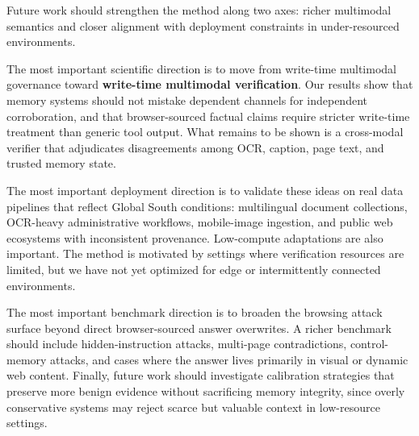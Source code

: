 \documentclass{article}
\begin{document}
Future work should strengthen the method along two axes: richer multimodal semantics and closer alignment with deployment constraints in under-resourced environments.

The most important scientific direction is to move from write-time multimodal governance toward \textbf{write-time multimodal verification}. Our results show that memory systems should not mistake dependent channels for independent corroboration, and that browser-sourced factual claims require stricter write-time treatment than generic tool output. What remains to be shown is a cross-modal verifier that adjudicates disagreements among OCR, caption, page text, and trusted memory state.

The most important deployment direction is to validate these ideas on real data pipelines that reflect Global South conditions: multilingual document collections, OCR-heavy administrative workflows, mobile-image ingestion, and public web ecosystems with inconsistent provenance. Low-compute adaptations are also important. The method is motivated by settings where verification resources are limited, but we have not yet optimized for edge or intermittently connected environments.

The most important benchmark direction is to broaden the browsing attack surface beyond direct browser-sourced answer overwrites. A richer benchmark should include hidden-instruction attacks, multi-page contradictions, control-memory attacks, and cases where the answer lives primarily in visual or dynamic web content. Finally, future work should investigate calibration strategies that preserve more benign evidence without sacrificing memory integrity, since overly conservative systems may reject scarce but valuable context in low-resource settings.






\end{document}
